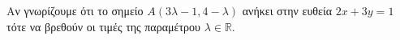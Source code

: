 Αν γνωρίζουμε ότι το σημείο $ A(3\lambda-1,4-\lambda) $ ανήκει στην ευθεία $ 2x+3y=1 $ τότε να βρεθούν οι τιμές της παραμέτρου $ \lambda\in\mathbb{R} $.
